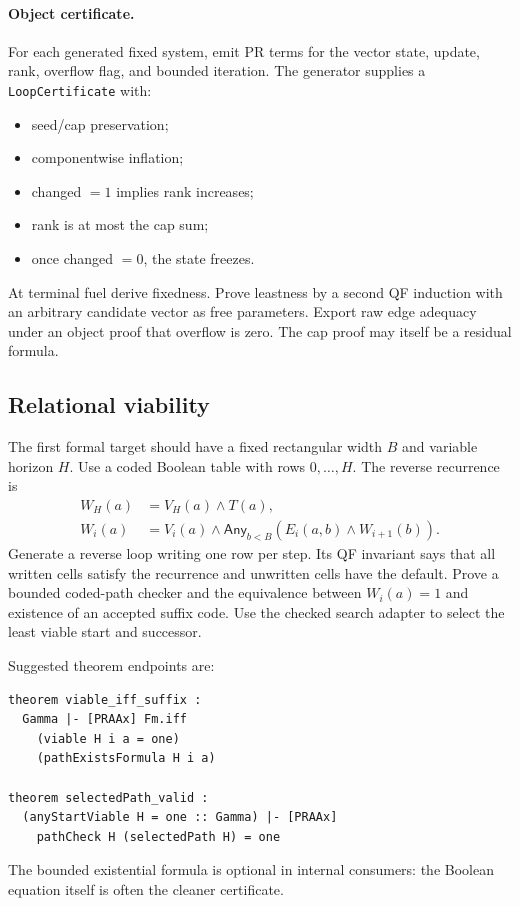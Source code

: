 \paragraph{Object certificate.}
For each generated fixed system, emit PR terms for the vector state, update, rank, overflow flag, and bounded iteration.  The generator supplies a \texttt{LoopCertificate} with:
\begin{itemize}
  \item seed/cap preservation;
  \item componentwise inflation;
  \item changed \(=1\) implies rank increases;
  \item rank is at most the cap sum;
  \item once changed \(=0\), the state freezes.
\end{itemize}
At terminal fuel derive fixedness.  Prove leastness by a second QF induction with an arbitrary candidate vector as free parameters.  Export raw edge adequacy under an object proof that overflow is zero.  The cap proof may itself be a residual formula.

\subsection{Relational viability}

The first formal target should have a fixed rectangular width \(B\) and variable horizon \(H\).  Use a coded Boolean table with rows \(0,\ldots,H\).  The reverse recurrence is
\begin{align*}
 W_H(a)&=V_H(a)\wedge T(a),\\
 W_i(a)&=V_i(a)\wedge \mathsf{Any}_{b<B}
       (E_i(a,b)\wedge W_{i+1}(b)).
\end{align*}
Generate a reverse loop writing one row per step.  Its QF invariant says that all written cells satisfy the recurrence and unwritten cells have the default.  Prove a bounded coded-path checker and the equivalence between \(W_i(a)=1\) and existence of an accepted suffix code.  Use the checked search adapter to select the least viable start and successor.

Suggested theorem endpoints are:

\begin{lstlisting}
theorem viable_iff_suffix :
  Gamma |- [PRAAx] Fm.iff
    (viable H i a = one)
    (pathExistsFormula H i a)

theorem selectedPath_valid :
  (anyStartViable H = one :: Gamma) |- [PRAAx]
    pathCheck H (selectedPath H) = one
\end{lstlisting}
The bounded existential formula is optional in internal consumers: the Boolean equation itself is often the cleaner certificate.

